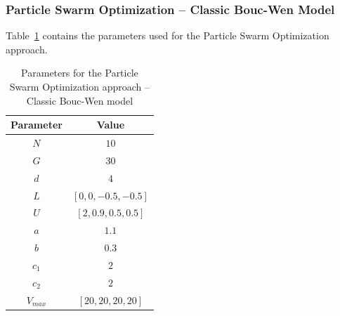 \subsubsection{Particle Swarm Optimization -- Classic Bouc-Wen Model}

Table~\ref{tab:pso_classic_params} contains the parameters used for the
Particle Swarm Optimization approach. 

\begin{table}[H]
	\centering
	\begin{tabular}{c c}
		\toprule
		\textbf{Parameter} & \textbf{Value} \\ \toprule
		$N$			& $10$ \\
		$G$			& $30$ \\
		$d$			& $4$  \\
		$L$			& $\left[0, 0, -0.5, -0.5\right]$ \\
		$U$			& $\left[2, 0.9, 0.5, 0.5\right]$ \\ 
		$a$			& $1.1$ \\
		$b$			& $0.3$ \\ 
		$c_1$		& $2$	\\
		$c_2$		& $2$	\\ 
		$V_{max}$	& $\left[20,20,20,20\right]$ \\ \bottomrule
	\end{tabular}
	\caption{Parameters for the Particle Swarm Optimization approach -- Classic Bouc-Wen model}
	\label{tab:pso_classic_params}
\end{table}

